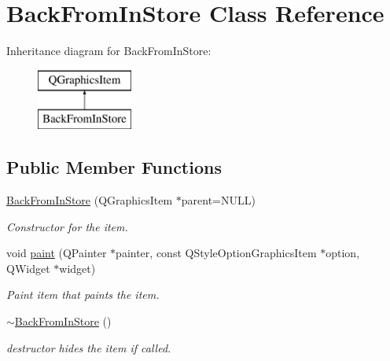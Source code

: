 \hypertarget{class_back_from_in_store}{\section{Back\-From\-In\-Store Class Reference}
\label{class_back_from_in_store}
}
Inheritance diagram for Back\-From\-In\-Store\-:\begin{figure}[H]
\begin{center}
\leavevmode
\includegraphics[height=2.000000cm]{class_back_from_in_store}
\end{center}
\end{figure}
\subsection*{Public Member Functions}
\begin{DoxyCompactItemize}
\item 
\hyperlink{class_back_from_in_store_a3bbe96f2b704d66dd72193a8c9157162}{Back\-From\-In\-Store} (Q\-Graphics\-Item $\ast$parent=N\-U\-L\-L)
\begin{DoxyCompactList}\small\item\em Constructor for the item. \end{DoxyCompactList}\item 
void \hyperlink{class_back_from_in_store_a6f36fa5bfe7d155b6d9d0899615430dc}{paint} (Q\-Painter $\ast$painter, const Q\-Style\-Option\-Graphics\-Item $\ast$option, Q\-Widget $\ast$widget)
\begin{DoxyCompactList}\small\item\em Paint item that paints the item. \end{DoxyCompactList}\item 
\hypertarget{class_back_from_in_store_a09fc63157033073cee58a3044113d224}{\hyperlink{class_back_from_in_store_a09fc63157033073cee58a3044113d224}{$\sim$\-Back\-From\-In\-Store} ()}\label{class_back_from_in_store_a09fc63157033073cee58a3044113d224}

\begin{DoxyCompactList}\small\item\em destructor hides the item if called. \end{DoxyCompactList}\end{DoxyCompactItemize}
